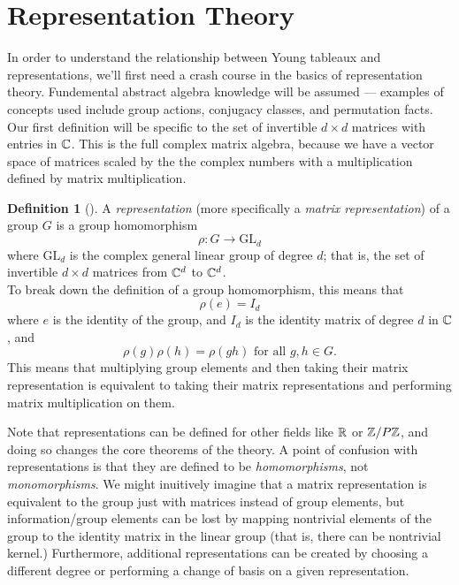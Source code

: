 \documentclass[12pt,twoside]{reedthesis}
\theoremstyle{plain}   %
\theoremstyle{definition}
\newtheorem{defn}{Definition}[section]
\theoremstyle{remark}
\numberwithin{equation}{section}
\def\GL{\mathrm{GL}} \def\SL{\mathrm{SL}}  \def\SP{\mathrm{SL}}\def\OG{\mathrm{O}}
\begin{document}
   \section{Representation Theory}
   In order to understand the relationship between Young tableaux and representations,
   we'll first need a crash course in the basics of representation theory.
   Fundemental abstract algebra knowledge will be assumed --- examples of concepts used include group actions, conjugacy classes, and
   permutation facts.
   Our first definition will be specific to the set of invertible $d \times d$ matrices with entries in $\mathbb{C}$.
   This is the full complex matrix algebra, because we have a vector space of matrices scaled by the the complex numbers
   with a multiplication defined by matrix multiplication.
   \begin{defn}[{\cite[Definition 1.2.1]{sagan}}]
     A \emph{representation} (more specifically a \emph{matrix representation}) of a group $G$ is a group homomorphism
     \[\rho: G \to \GL_d\]
     where $\GL_d$ is the complex general linear group of degree $d$; that is, the set of
     invertible $d \times d$ matrices from $\mathbb{C}^d$ to $\mathbb{C}^d$. \\
     To break down the definition of a group homomorphism, this means that
     \[ \rho(e) = I_d\]
     where $e$ is the identity of the group, and $I_d$ is the identity matrix of degree $d$ in $\mathbb{C}$, and
     \[\rho(g)\rho(h) = \rho(gh) \text{ for all $g,h \in G$.}\]
     This means that multiplying group elements and then taking their matrix representation is equivalent to
     taking their matrix representations and performing matrix multiplication on them.
   \end{defn}
   Note that representations can be defined for other fields like $\mathbb{R}$ or $\mathbb{Z}/P\mathbb{Z}$, and doing so changes the core theorems of the theory.
   A point of confusion with representations is that they are defined to be \emph{homomorphisms}, not \emph{monomorphisms}.
   We might inuitively imagine that a matrix representation is equivalent to the group just with matrices instead of group elements,
   but information/group elements can be lost by mapping nontrivial elements of the group to the identity matrix in the linear group
   (that is, there can be nontrivial kernel.)
   Furthermore, additional representations can be created by choosing a different degree or performing a change of basis on a given representation.
\end{document}
